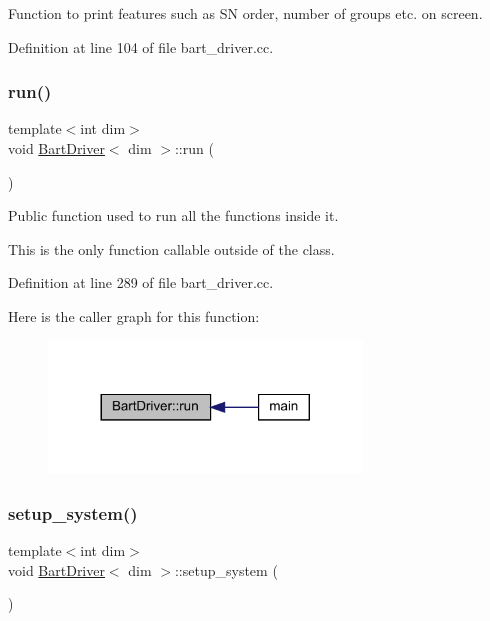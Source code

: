 Function to print features such as SN order, number of groups etc. on screen. 



Definition at line 104 of file bart\+\_\+driver.\+cc.

\mbox{\label{class_bart_driver_a20c70ef3733fc4406353e6fdfee6c684}} 
\subsubsection{\texorpdfstring{run()}{run()}}
{\footnotesize\ttfamily template$<$int dim$>$ \\
void \hyperlink{class_bart_driver}{Bart\+Driver}$<$ dim $>$\+::run (\begin{DoxyParamCaption}{ }\end{DoxyParamCaption})}



Public function used to run all the functions inside it. 

This is the only function callable outside of the class. 

Definition at line 289 of file bart\+\_\+driver.\+cc.

Here is the caller graph for this function\+:\nopagebreak
\begin{figure}[H]
\begin{center}
\leavevmode
\includegraphics[width=236pt]{class_bart_driver_a20c70ef3733fc4406353e6fdfee6c684_icgraph}
\end{center}
\end{figure}
\mbox{\label{class_bart_driver_a54ac94a562fa8f5cdb13ba6c56965b9c}} 
\subsubsection{\texorpdfstring{setup\+\_\+system()}{setup\_system()}}
{\footnotesize\ttfamily template$<$int dim$>$ \\
void \hyperlink{class_bart_driver}{Bart\+Driver}$<$ dim $>$\+::setup\+\_\+system (\begin{DoxyParamCaption}{ }\end{DoxyParamCaption})\hspace{0.3cm}{\ttfamily [private]}}

